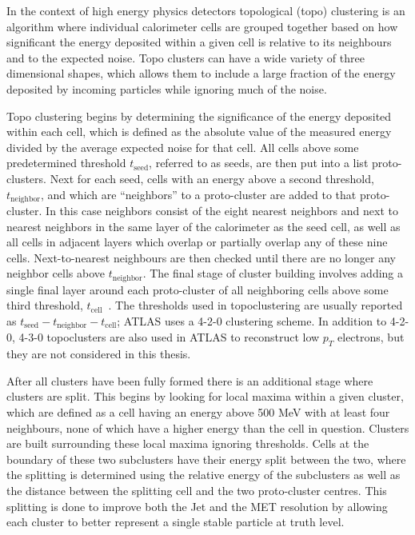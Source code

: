 In the context of high energy physics detectors topological (topo) clustering is an algorithm where individual calorimeter cells are grouped together based on how significant the energy deposited within a given cell is relative to its neighbours and to the expected noise.  
Topo clusters can have a wide variety of three dimensional shapes, which allows them to include a large fraction of the energy deposited by incoming particles while ignoring much of the noise.  

Topo clustering begins by determining the significance of the energy deposited within each cell, which is defined as the absolute value of the measured energy divided by the average expected noise for that cell.  
All cells above some predetermined threshold $t_{\mathrm{seed}}$, referred to as seeds, are then put into a list proto-clusters.  
Next for each seed, cells with an energy above a second threshold, $t_{\mathrm{neighbor}}$, and which are ``neighbors'' to a proto-cluster are added to that proto-cluster.  
In this case neighbors consist of the eight nearest neighbors and next to nearest neighbors in the same layer of the calorimeter as the seed cell, as well as all cells in adjacent layers which overlap or partially overlap any of these nine cells.  
Next-to-nearest neighbours are then checked until there are no longer any neighbor cells above $t_{\mathrm{neighbor}}$.  
The final stage of cluster building involves adding a single final layer around each proto-cluster of all neighboring cells above some third threshold, $t_{\mathrm{cell}}$~\cite{1603.02934}.  
The thresholds used in topoclustering are usually reported as $t_{\mathrm{seed}}-t_{\mathrm{neighbor}}-t_{\mathrm{cell}}$; ATLAS uses a 4-2-0 clustering scheme.  
In addition to 4-2-0, 4-3-0 topoclusters are also used in ATLAS to reconstruct low $p_T$ electrons, but they are not considered in this thesis.   

After all clusters have been fully formed there is an additional stage where clusters are split.  
This begins by looking for local maxima within a given cluster, which are defined as a cell having an energy above 500 MeV with at least four neighbours, none of which have a higher energy than the cell in question.  
Clusters are built surrounding these local maxima ignoring thresholds.  
Cells at the boundary of these two subclusters have their energy split between the two, where the splitting is determined using the relative energy of the subclusters as well as the distance between the splitting cell and the two proto-cluster centres.  
This splitting is done to improve both the Jet and the MET resolution by allowing each cluster to better represent a single stable particle at truth level.  


